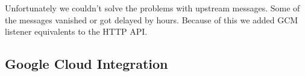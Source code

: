 Unfortunately we couldn't solve the problems with upstream messages. Some of the messages vanished or got delayed by hours. Because of this we added GCM listener equivalents to the HTTP API.


\subsection{Google Cloud Integration}
